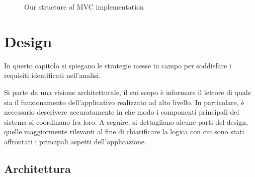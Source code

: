 \documentclass[a4paper,12pt]{report}
\begin{document}
\begin{figure}[H]
\centering{}
%
\caption{Our structure of MVC implementation}
\label{img:MVC}
\end{figure}

\chapter{Design}

In questo capitolo si spiegano le strategie messe in campo per soddisfare i requisiti identificati nell'analisi.

Si parte da una visione architetturale, il cui scopo è informare il lettore di quale sia il funzionamento dell'applicativo realizzato ad alto livello.
%
In particolare, è necessario descrivere accuratamente in che modo i componenti principali del sistema si coordinano fra loro.
%
A seguire, si dettagliano alcune parti del design, quelle maggiormente rilevanti al fine di chiarificare la logica con cui sono stati affrontati i principali aspetti dell'applicazione.

\section{Architettura}
\end{document}

